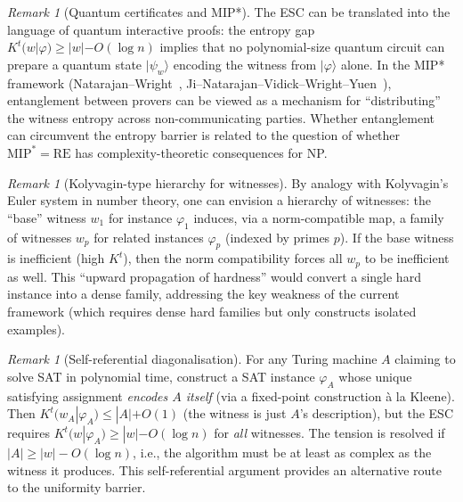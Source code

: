 \documentclass[aps,prd,twocolumn,superscriptaddress,nofootinbib]{revtex4-2}
\theoremstyle{definition}
\theoremstyle{remark}
\newtheorem{remark}[theorem]{Remark}
\begin{document}
\begin{remark}[Quantum certificates and MIP*]
\label{rem:quantum-certificates}
The ESC can be translated into the language of quantum interactive proofs: the entropy gap $K^t(w|\varphi) \geq |w| - O(\log n)$ implies that no polynomial-size quantum circuit can prepare a quantum state $|\psi_w\rangle$ encoding the witness from $|\varphi\rangle$ alone. In the MIP* framework (Natarajan--Wright~\cite{NatarajanWright2019}, Ji--Natarajan--Vidick--Wright--Yuen~\cite{JiNatarajanVidickWrightYuen2021}), entanglement between provers can be viewed as a mechanism for ``distributing'' the witness entropy across non-communicating parties. Whether entanglement can circumvent the entropy barrier is related to the question of whether $\mathrm{MIP}^* = \mathrm{RE}$ has complexity-theoretic consequences for NP.
\end{remark}

\begin{remark}[Kolyvagin-type hierarchy for witnesses]
\label{rem:kolyvagin-hierarchy}
By analogy with Kolyvagin's Euler system in number theory, one can envision a hierarchy of witnesses: the ``base'' witness $w_1$ for instance $\varphi_1$ induces, via a norm-compatible map, a family of witnesses $w_p$ for related instances $\varphi_p$ (indexed by primes $p$). If the base witness is inefficient (high $K^t$), then the norm compatibility forces all $w_p$ to be inefficient as well. This ``upward propagation of hardness'' would convert a single hard instance into a dense family, addressing the key weakness of the current framework (which requires dense hard families but only constructs isolated examples).
\end{remark}

\begin{remark}[Self-referential diagonalisation]
\label{rem:self-referential}
For any Turing machine $A$ claiming to solve SAT in polynomial time, construct a SAT instance $\varphi_A$ whose unique satisfying assignment \emph{encodes $A$ itself} (via a fixed-point construction \`a la Kleene). Then $K^t(w_A | \varphi_A) \leq |A| + O(1)$ (the witness is just $A$'s description), but the ESC requires $K^t(w | \varphi_A) \geq |w| - O(\log n)$ for \emph{all} witnesses. The tension is resolved if $|A| \geq |w| - O(\log n)$, i.e., the algorithm must be at least as complex as the witness it produces. This self-referential argument provides an alternative route to the uniformity barrier.
\end{remark}
\end{document}

